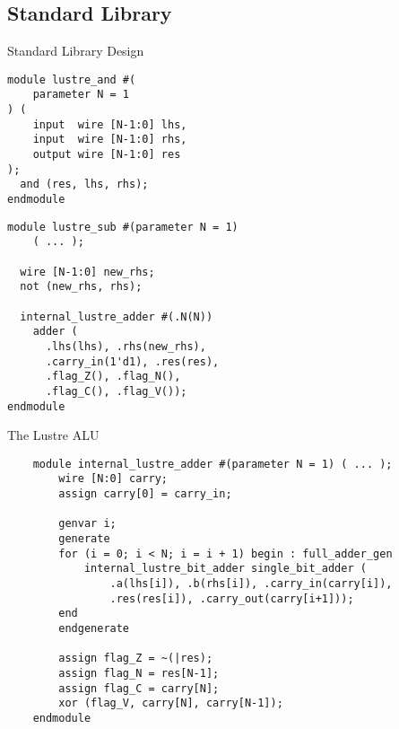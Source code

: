 \documentclass{beamer}
\begin{document}
\subsection{Standard Library}

\begin{frame}[fragile]{Standard Library Design}
    \begin{minipage}{0.49\textwidth}
        \begin{verbatim}
module lustre_and #(
    parameter N = 1
) (
    input  wire [N-1:0] lhs,
    input  wire [N-1:0] rhs,
    output wire [N-1:0] res
);
  and (res, lhs, rhs);
endmodule
        \end{verbatim}
    \end{minipage}
    \hfill
    \begin{minipage}{0.49\textwidth}
        \begin{verbatim}
module lustre_sub #(parameter N = 1)
    ( ... );

  wire [N-1:0] new_rhs;
  not (new_rhs, rhs);

  internal_lustre_adder #(.N(N))
    adder (
      .lhs(lhs), .rhs(new_rhs),
      .carry_in(1'd1), .res(res),
      .flag_Z(), .flag_N(),
      .flag_C(), .flag_V());
endmodule
        \end{verbatim}
    \end{minipage}
\end{frame}

\begin{frame}[fragile]{The Lustre ALU}
    \begin{footnotesize}
        \begin{verbatim}
    module internal_lustre_adder #(parameter N = 1) ( ... );
        wire [N:0] carry;
        assign carry[0] = carry_in;

        genvar i;
        generate
        for (i = 0; i < N; i = i + 1) begin : full_adder_gen
            internal_lustre_bit_adder single_bit_adder (
                .a(lhs[i]), .b(rhs[i]), .carry_in(carry[i]),
                .res(res[i]), .carry_out(carry[i+1]));
        end
        endgenerate

        assign flag_Z = ~(|res);
        assign flag_N = res[N-1];
        assign flag_C = carry[N];
        xor (flag_V, carry[N], carry[N-1]);
    endmodule
        \end{verbatim}
    \end{footnotesize}
\end{frame}
\end{document}
